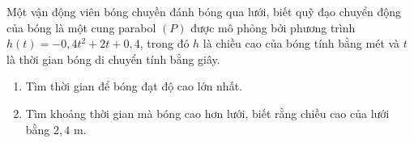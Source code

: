 \begin{bt}%
	Một vận động viên bóng chuyền đánh bóng qua lưới, biết quỹ đạo chuyển động của bóng là một cung parabol $(P)$ được mô phỏng bởi phương trình $h(t)=-0{,}4t^2+2t+0{,}4$, trong đó $h$ là chiều cao của bóng tính bằng mét và $t$ là thời gian bóng di chuyển tính bằng giây.
	\begin{enumerate}
		\item Tìm thời gian để bóng đạt độ cao lớn nhất.
		\item Tìm khoảng thời gian mà bóng cao hơn lưới, biết rằng chiều cao của lưới bằng $2{,}4$ m.
	\end{enumerate}


\end{bt}
